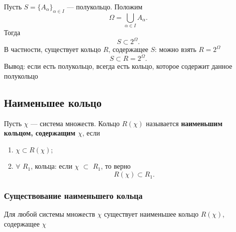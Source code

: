 \begin{exercise}[Замечание]
    Пусть $S = \{A_\alpha\}_{\alpha \in I}$ --- полукольцо.
    Положим
    \[
        \Omega = \bigcup_{\alpha \in I} A_\alpha.
    \]
    Тогда
    \[
        S \subset 2^\Omega.
    \]
    В частности, существует кольцо $R$, содержащее $S$:
    можно взять $R = 2^\Omega$
    \[
        S \subset R = 2^\Omega.
    \]
    Вывод: если есть полукольцо, всегда есть кольцо, которое содержит данное полукольцо
\end{exercise}

\subsection{Наименьшее кольцо}
\begin{definition}
    Пусть $\chi$ --- система множеств.
    Кольцо $R(\chi)$ называется \textbf{наименьшим кольцом,
    содержащим $\chi$}, если
    \begin{enumerate}[label=\arabic*)]
        \item $\chi \subset R(\chi)$;
        \item $\forall$ $R_1$, кольца: если $\chi$ $\subset$ $R_1$, то верно
        \[
            R(\chi) \subset R_1.
        \]
    \end{enumerate}

\end{definition}

\subsubsection{Существование наименьшего кольца}

\begin{theorem}
    Для любой системы множеств $\chi$ существует
    наименьшее кольцо $R(\chi)$, содержащее $\chi$
\end{theorem}

